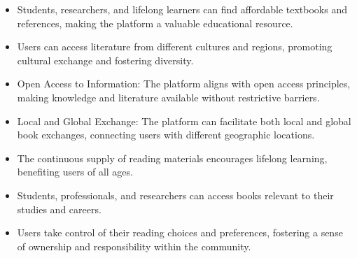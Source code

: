 \documentclass{article}
\begin{document}
\begin{itemize}
\item Students, researchers, and lifelong learners can find affordable textbooks and references, making the platform a valuable educational resource.
\item Users can access literature from different cultures and regions, promoting cultural exchange and fostering diversity.

\item Open Access to Information: The platform aligns with open access principles, making knowledge and literature available without restrictive barriers.

\item Local and Global Exchange: The platform can facilitate both local and global book exchanges, connecting users with different geographic locations.

\item The continuous supply of reading materials encourages lifelong learning, benefiting users of all ages.

\item Students, professionals, and researchers can access books relevant to their studies and careers.
\item Users take control of their reading choices and preferences, fostering a sense of ownership and responsibility within the community.


\end{itemize}
\end{document}
